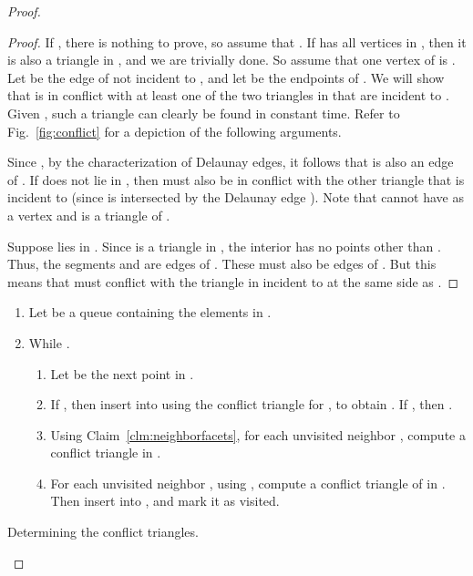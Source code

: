 \documentclass{siamltex}
\begin{document}
\begin{proof}
\begin{proof}
If , there is nothing to prove, so assume that .
If  has all vertices in , then it is also
a triangle in , and we are trivially done.
So assume that one vertex of  is .
Let  be the edge of  not incident to , and let
 be the endpoints of .
We will show that  is in conflict with at least one of the two
triangles in  that are incident to . Given , such a triangle can 
clearly be found in constant time. Refer to Fig.~\ref{fig:conflict} 
for a depiction of the following arguments.

Since , by the characterization
of Delaunay edges, it follows that  is also an edge of . 
If  does not lie in , then  must 
also be in conflict with the other triangle  that is incident
to  (since  is intersected by the Delaunay edge ).
Note that  cannot have  as a vertex and is a triangle of .

Suppose  lies in . Since 
is a triangle in , the interior has no points other
than .
Thus, the segments  and  
are edges of .
These must also be edges of 
. But this means that  must conflict
with the triangle in  incident to  at the same side as
.
\end{proof}
\medskip

\begin{algorithm}
\begin{enumerate}
\item Let  be a queue containing the elements in . 

\item\label{step:Qloop} While .

\begin{enumerate}
 \item Let  be the next point in .
 \item\label{step:insert2} If , then insert  into  
 using the conflict triangle  for , to obtain .
 If , then .
 \item\label{step:applyClaim} Using Claim~\ref{clm:neighborfacets}, for 
            each unvisited neighbor , 
	    compute a conflict triangle  in .
 \item\label{step:getSfacet} For each unvisited neighbor 
           , using
           , compute a conflict triangle  
	   of  in . Then
           insert  into , and mark it as visited.
\end{enumerate}
\end{enumerate}
\caption{Determining the conflict triangles.}
\label{alg:conflicts}
\end{algorithm}


\end{proof}
\end{document}

